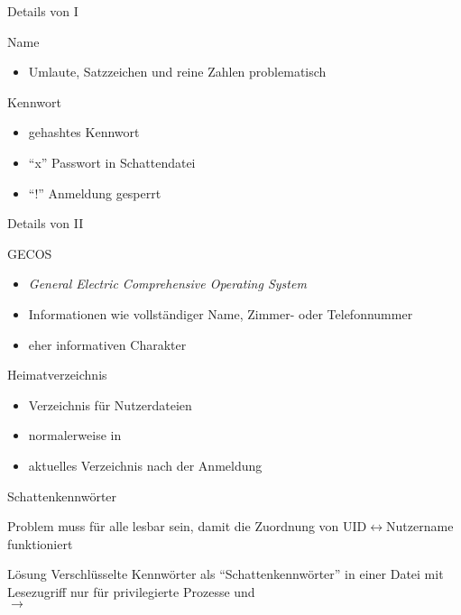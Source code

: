 \documentclass[aspectratio=43]{beamer}
\begin{document}
\begin{frame}{Details von  I}
  \begin{block}{Name}
    \begin{itemize}
      \item Umlaute, Satzzeichen und reine Zahlen problematisch
    \end{itemize}
  \end{block}
  \begin{block}{Kennwort}
    \begin{itemize}
      \item gehashtes Kennwort
      \item ``x'' Passwort in Schattendatei
      \item ``!'' Anmeldung gesperrt
    \end{itemize}
  \end{block}
\end{frame}

\begin{frame}{Details von  II}
  \begin{block}{GECOS}
    \begin{itemize}
      \item \emph{General Electric Comprehensive Operating System}
      \item Informationen wie vollständiger Name, Zimmer- oder Telefonnummer
      \item eher informativen Charakter
    \end{itemize}
  \end{block}
  \begin{block}{Heimatverzeichnis}
    \begin{itemize}
      \item Verzeichnis für Nutzerdateien
      \item normalerweise in 
      \item aktuelles Verzeichnis nach der Anmeldung
    \end{itemize}
  \end{block}
\end{frame}

\begin{frame}{Schattenkennwörter}
  \begin{alertblock}{Problem}
     muss für alle lesbar sein, 
    damit die Zuordnung von UID$\leftrightarrow$Nutzername funktioniert
  \end{alertblock}

  \begin{exampleblock}{Lösung}
      Verschlüsselte Kennwörter als ``Schattenkennwörter'' in einer Datei
        mit Lesezugriff nur für privilegierte Prozesse und \\
        $\rightarrow$ 
  \end{exampleblock}
\end{frame}
\end{document}
